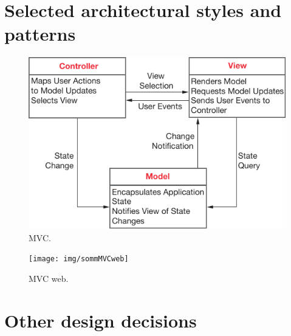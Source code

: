 \clearpage%
\section{Selected architectural styles and patterns}\label{sec:styles}


%
%
%
%
%




\begin{figure}%
	\centering%
	\includegraphics{img/sommMVC}%
	\caption{MVC.}
\end{figure}

\begin{figure}%
	\centering%
	\texttt{[image: img/sommMVCweb]}%
	\caption{MVC web.}
\end{figure}






\clearpage%
\section{Other design decisions}\label{sec:decisions}
\lipsum[1-2]
